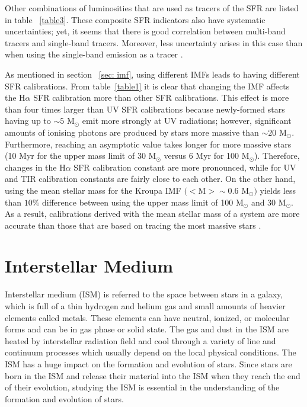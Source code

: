 Other combinations of luminosities that are used as tracers of the SFR are listed in table ~\ref{table3}. These composite SFR indicators also have systematic uncertainties; yet, it seems that there is good correlation between multi-band tracers and single-band tracers. Moreover, less uncertainty arises in this case than when using the single-band emission as a tracer \citep{Kennicutt09}. 

As mentioned in section ~\ref{sec: imf}, using different IMFs leads to having different SFR calibrations. From table~\ref{table1} it is clear that changing the IMF affects the H${\alpha}$ SFR calibration more than other SFR calibrations. This effect is more than four times larger than UV SFR calibrations because newly-formed stars having up to $\sim 5$ M$_{\odot}$ emit more strongly at UV radiations; however, significant amounts of ionising photons are produced by stars more massive than $\sim 20$ M$_{\odot}$. Furthermore, reaching an asymptotic value takes longer for more massive stars (10 Myr for the upper mass limit of 30 M$_{\odot}$ versus 6 Myr for 100 M$_{\odot}$). Therefore, changes in the H${\alpha}$ SFR calibration constant are more pronounced, while for UV and TIR calibration constants are fairly close to each other. On the other hand, using the mean stellar mass for the Kroupa IMF $(<$M$> \sim 0.6$ M$_{\odot})$ yields less than $10\%$ difference between using the upper mass limit of 100 M$_{\odot}$ and 30 M$_{\odot}$. As a result, calibrations derived with the mean stellar mass of a system are more accurate than those that are based on tracing the most massive stars \citep{Calzetti13}.
 

\section{Interstellar Medium}

Interstellar medium (ISM) is referred to the space between stars in a galaxy, which is full of a thin hydrogen and helium gas and small amounts of heavier elements called metals. These elements can have neutral, ionized, or molecular forms and can be in gas phase or solid state. The gas and dust in the ISM are heated by interstellar radiation field and cool through a variety of line and continuum processes which usually depend on the local physical conditions. The ISM has a huge impact on the formation and evolution of stars. Since stars are born in the ISM and release their material into the ISM when they reach the end of their evolution, studying the ISM is essential in the understanding of the formation and evolution of stars.

